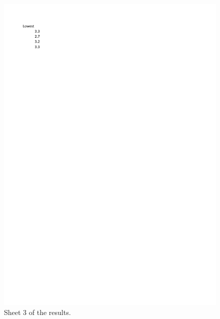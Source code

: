 \begin{figure}[ht]
\centering
\includegraphics[scale=0.75]{results3}
\caption{Sheet 3 of the results.}
\label{fig:results}
\end{figure}